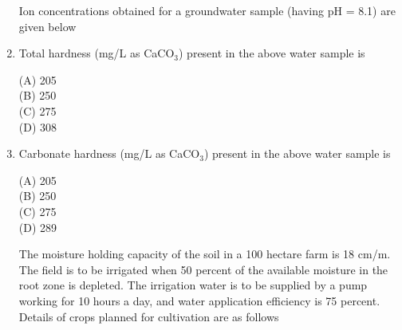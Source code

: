 \documentclass[journal,12pt,onecolumn]{exam}
\theoremstyle{remark}
\begin{document}
\begin{enumerate}
\setlength{\parskip}{0.5cm}


\noindent Ion concentrations obtained for a groundwater sample (having pH = 8.1) are given below
\begin{table}[H]
\label{table4}
\end{table}
\noindent\item Total hardness (mg/L as CaCO\(_3\)) present in the above water sample is

\setlength{\parskip}{0.5cm}

\hfill{}

\begin{multicols}{4}
\noindent(A) 205\\
(B) 250\\
(C) 275\\
(D) 308
\end{multicols}

\setlength{\parskip}{0.5cm}
\noindent\item Carbonate hardness (mg/L as CaCO\(_3\)) present in the above water sample is

\setlength{\parskip}{0.5cm}

\hfill{}

\begin{multicols}{4}
\noindent(A) 205\\
(B) 250\\
(C) 275\\
(D) 289
\end{multicols}

\setlength{\parskip}{0.5cm}


\noindent The moisture holding capacity of the soil in a 100 hectare farm is 18 cm/m. The field is to be irrigated when 50 percent of the available moisture in the root zone is depleted. The irrigation water is to be supplied by a pump working for 10 hours a day, and water application efficiency is 75 percent. Details of crops planned for cultivation are as follows


\end{enumerate}
\end{document}
